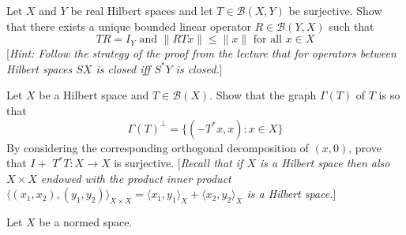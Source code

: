 \documentclass[answers]{exam}
\begin{document}
\begin{questions}

\question%
Let $X$ and $Y$ be real Hilbert spaces and let $T \in \mathcal{B}(X, Y)$ be surjective. Show that there exists a unique bounded linear operator $R \in \mathcal{B}(Y, X)$ such that \[
	T R=I_{Y} \text{ and }\|R T x\| \leqslant\|x\| \text{ for all } x \in X
\] [\emph{Hint: Follow the strategy of the proof from the lecture that for operators between Hilbert spaces $S X$ is closed iff $S^{*} Y$ is closed.}]



\question%
Let $X$ be a Hilbert space and $T \in \mathcal{B}(X)$. Show that the graph $\Gamma(T)$ of $T$ is so that \[
	\Gamma(T)^{\perp}=\{(-T^{*} x, x): x \in X\}
\] By considering the corresponding orthogonal decomposition of $(x, 0)$, prove that $I+$ $T^{*} T: X \to X$ is surjective. [\emph{Recall that if $X$ is a Hilbert space then also $X \times X$ endowed with the product inner product $\langle(x_{1}, x_{2}),(y_{1}, y_{2})\rangle_{X \times X}=\langle x_{1}, y_{1}\rangle_{X}+\langle x_{2}, y_{2}\rangle_{X}$ is a Hilbert space.}]



\question%
Let $X$ be a normed space.




\end{questions}
\end{document}
